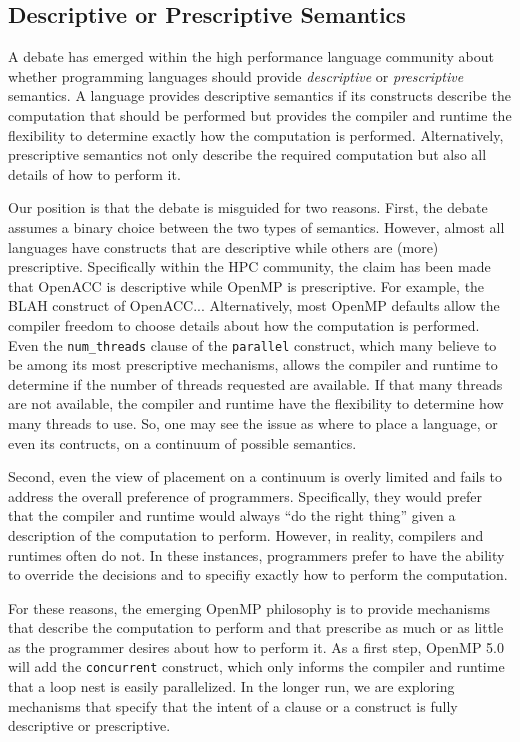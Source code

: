 \subsection{Descriptive or Prescriptive Semantics}
\label{sub:descriptive}

A debate has emerged within the high performance language
community about whether programming languages should 
provide \emph{descriptive} or \emph{prescriptive} semantics. 
A language provides descriptive semantics if its constructs 
describe the computation that should be performed but provides 
the compiler and runtime the flexibility to determine exactly 
how the computation is performed. Alternatively, prescriptive
semantics not only describe the required computation but 
also all details of how to perform it.

Our position is that the debate is misguided for two reasons.
First, the debate assumes a binary choice between the two 
types of semantics. However, almost all languages have constructs 
that are descriptive while others are (more) prescriptive. 
Specifically within the HPC community, the claim has been 
made that OpenACC is descriptive while OpenMP is prescriptive.
For example, the BLAH construct of OpenACC...
Alternatively, most OpenMP defaults allow the compiler freedom
to choose details about how the computation is performed. Even
the \texttt{num\_threads} clause of the \texttt{parallel} construct,
which many believe to be among its most prescriptive mechanisms,
allows the compiler and runtime to determine if the number of
threads requested are available. If that many threads are not
available, the compiler and runtime have the flexibility to
determine how many threads to use. So, one may see the issue 
as where to place a language, or even its contructs, on a 
continuum of possible semantics.

Second, even the view of placement on a continuum is overly
limited and fails to address the overall preference of 
programmers. Specifically, they would prefer that the compiler
and runtime would always ``do the right thing'' given a 
description of the computation to perform. However, in reality,
compilers and runtimes often do not. In these instances,
programmers prefer to have the ability to override the
decisions and to specifiy exactly how to perform the computation.

For these reasons, the emerging OpenMP philosophy is to provide
mechanisms that describe the computation to perform and that
prescribe as much or as little as the programmer desires about
how to perform it. As a first step, OpenMP 5.0 will add the 
\texttt{concurrent} construct, which only informs the compiler 
and runtime that a loop nest is easily parallelized. In the 
longer run, we are exploring mechanisms that specify that the 
intent of a clause or a construct is fully descriptive or prescriptive.
